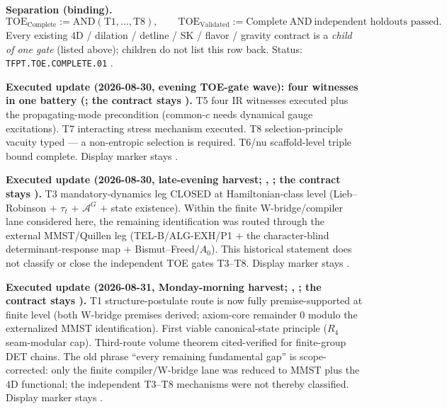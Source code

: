 \par\smallskip\noindent\textbf{Separation (binding).}
\[
  \mathrm{TOE}_{\mathrm{Complete}}:=\mathrm{AND}(\mathrm{T1},\ldots,\mathrm{T8}),
  \qquad
  \mathrm{TOE}_{\mathrm{Validated}}:=\mathrm{Complete}\ \mathrm{AND}\ \text{independent holdouts passed}.
\]
Every existing $4$D / dilation / detline / SK / flavor / gravity contract is a \emph{child of
one gate} (listed above); children do not list this row back.  Status:
\texttt{TFPT.TOE.COMPLETE.01} \mO.

\par\smallskip\noindent\textbf{Executed update (2026-08-30, evening TOE-gate wave): four witnesses
in one battery
(; the contract stays \mO).}
T5 four IR witnesses executed plus the propagating-mode precondition (common-$c$ needs dynamical
gauge excitations).  T7 interacting stress mechanism executed.  T8 selection-principle vacuity
typed --- a non-entropic selection is required.  T6/nu scaffold-level triple bound complete.
Display marker stays \mO.

\par\smallskip\noindent\textbf{Executed update (2026-08-30, late-evening harvest;
,
;
the contract stays \mO).}
T3 mandatory-dynamics leg CLOSED at Hamiltonian-class level (Lieb--Robinson $+$ $\tau_t$ $+$
$\mathcal A^G$ $+$ state existence).  Within the finite W-bridge/compiler lane considered
here, the remaining identification was routed through the external MMST/Quillen leg
(TEL-B/ALG-EXH/P1 $+$ the character-blind determinant-response map $+$
Bismut--Freed/$A_0$).  This historical statement does not classify or close the
independent TOE gates T3--T8.  Display marker stays \mO.

\par\smallskip\noindent\textbf{Executed update (2026-08-31, Monday-morning harvest;
,
;
the contract stays \mO).}
T1 structure-postulate route is now fully premise-supported at finite level (both
W-bridge premises derived; axiom-core remainder $0$ modulo the externalized MMST
identification).  First viable canonical-state principle ($R_4$ seam-modular cap).
Third-route volume theorem cited-verified for finite-group DET chains.  The old phrase
``every remaining fundamental gap'' is scope-corrected: only the finite compiler/W-bridge
lane was reduced to MMST plus the $4$D functional; the independent T3--T8 mechanisms were
not thereby classified.  Display marker stays \mO.

